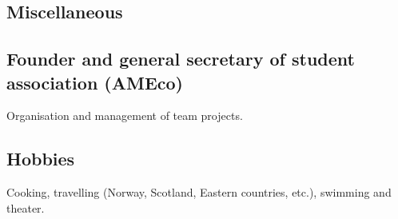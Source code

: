 \documentclass[a4paper,11pt]{arthur-cv}
\begin{document}
\begin{textblock}{20.5}
\begin{minipage}[t]{0.62\textwidth}
    \section{Miscellaneous}
      \subsection{Founder and general secretary of student association (AMEco)}{Organisation and management of team projects.}
      \subsection{Hobbies}{Cooking, travelling (Norway, Scotland, Eastern countries, etc.), swimming and theater.}

  \end{minipage}

\end{textblock}
\end{document}
